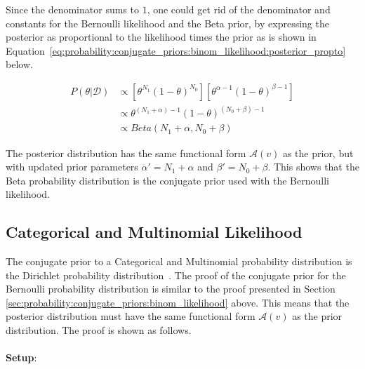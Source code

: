 \noindent
Since the denominator sums to $1$, one could get rid of the denominator and constants for the Bernoulli likelihood and the Beta prior, by expressing the posterior as proportional to the likelihood times the prior as is shown in Equation~\eqref{eq:probability:conjugate_priors:binom_likelihood:posterior_propto} below.

\begin{equation}
      \label{eq:probability:conjugate_priors:binom_likelihood:posterior_propto}
      \begin{split}
            P(\theta | \mathcal{D}) &\propto \left[\theta^{N_{1}}(1-\theta)^{N_{0}}\right] \left[\theta^{\alpha - 1} (1 - \theta)^{\beta - 1}\right] \\
            &\propto \theta^{(N_{1} + \alpha) - 1}(1-\theta)^{(N_{0} + \beta) - 1} \\
            &\propto Beta(N_{1} + \alpha, N_{0} + \beta)
      \end{split}
\end{equation}

\noindent
The posterior distribution has the same functional form $\mathcal{A}(v)$ as the prior, but with updated prior parameters $\alpha' = N_{1} + \alpha$ and $\beta' = N_{0} + \beta$. This shows that the Beta probability distribution is the conjugate prior used with the Bernoulli likelihood.


\subsection{Categorical and Multinomial Likelihood}
\label{sec:probability:conjugate_priors:cat_mult_likelihood}

The conjugate prior to a Categorical and Multinomial probability distribution is the Dirichlet probability distribution~\cite{ref:wackerly:2014}. The proof of the conjugate prior for the Bernoulli probability distribution is similar to the proof presented in Section \ref{sec:probability:conjugate_priors:binom_likelihood} above. This means that the posterior distribution must have the same functional form $\mathcal{A}(v)$ as the prior distribution. The proof is shown as follows. \\\\
\textbf{Setup}:

